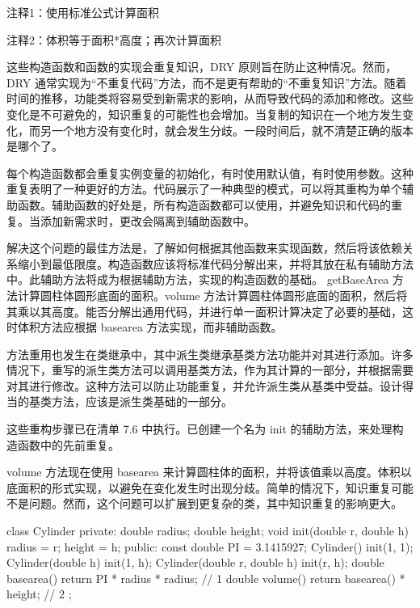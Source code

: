 {\footnotesize
注释1：使用标准公式计算面积

注释2：体积等于面积*高度；再次计算面积
}


这些构造函数和函数的实现会重复知识，DRY 原则旨在防止这种情况。然而，DRY 通常实现为“不重复代码”方法，而不是更有帮助的“不重复知识”方法。随着时间的推移，功能类将容易受到新需求的影响，从而导致代码的添加和修改。这些变化是不可避免的，知识重复的可能性也会增加。当复制的知识在一个地方发生变化，而另一个地方没有变化时，就会发生分歧。一段时间后，就不清楚正确的版本是哪个了。

每个构造函数都会重复实例变量的初始化，有时使用默认值，有时使用参数。这种重复表明了一种更好的方法。代码展示了一种典型的模式，可以将其重构为单个辅助函数。辅助函数的好处是，所有构造函数都可以使用，并避免知识和代码的重复。当添加新需求时，更改会隔离到辅助函数中。


解决这个问题的最佳方法是，了解如何根据其他函数来实现函数，然后将该依赖关系缩小到最低限度。构造函数应该将标准代码分解出来，并将其放在私有辅助方法中。此辅助方法将成为根据辅助方法，实现的构造函数的基础。
getBaseArea 方法计算圆柱体圆形底面的面积。volume 方法计算圆柱体圆形底面的面积，然后将其乘以其高度。能否分解出通用代码，并进行单一面积计算决定了必要的基础，这时体积方法应根据 basearea 方法实现，而非辅助函数。

方法重用也发生在类继承中，其中派生类继承基类方法功能并对其进行添加。许多情况下，重写的派生类方法可以调用基类方法，作为其计算的一部分，并根据需要对其进行修改。这种方法可以防止功能重复，并允许派生类从基类中受益。设计得当的基类方法，应该是派生类基础的一部分。

这些重构步骤已在清单 7.6 中执行。已创建一个名为 init 的辅助方法，来处理构造函数中的先前重复。

volume 方法现在使用 basearea 来计算圆柱体的面积，并将该值乘以高度。体积以底面积的形式实现，以避免在变化发生时出现分歧。简单的情况下，知识重复可能不是问题。然而，这个问题可以扩展到更复杂的类，其中知识重复的影响更大。


\begin{cpp}
class Cylinder {
private:
  double radius;
  double height;
  void init(double r, double h) {
    radius = r;
    height = h;
  }
public:
  const double PI = 3.1415927;
  Cylinder() { init(1, 1); }
  Cylinder(double h) { init(1, h); }
  Cylinder(double r, double h) { init(r, h); }
  double basearea() { return PI * radius * radius; } // 1
  double volume() { return basearea() * height; } // 2
};
\end{cpp}

